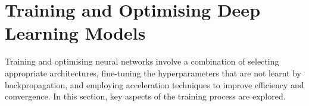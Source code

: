 \section{Training and Optimising Deep Learning Models}
Training and optimising neural networks involve a combination of selecting appropriate architectures, fine-tuning the hyperparameters that are not learnt by backpropagation, and employing acceleration techniques to improve efficiency and convergence. In this section, key aspects of the training process are explored.

